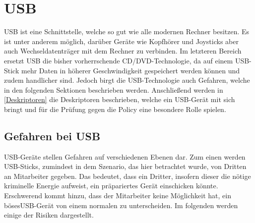 \chapter{USB}
USB ist eine Schnittstelle, welche so gut wie alle modernen Rechner besitzen. Es ist unter anderem möglich, darüber Geräte wie Kopfhörer und Joysticks aber auch Wechseldatenträger mit dem Rechner zu verbinden. Im letzteren Bereich ersetzt USB die bisher vorherrschende CD/DVD-Technologie, da auf einem USB-Stick mehr Daten in höherer Geschwindigkeit gespeichert werden können und zudem handlicher sind. Jedoch birgt die USB-Technologie auch Gefahren, welche in den folgenden Sektionen beschrieben werden. Anschließend werden in \ref{Deskriptoren} die Deskriptoren beschrieben, welche ein USB-Gerät mit sich bringt und für die Prüfung gegen die Policy eine besondere Rolle spielen.

\section{Gefahren bei USB}\label{GefBeiUSB}
USB-Geräte stellen Gefahren auf verschiedenen Ebenen dar. Zum einen werden USB-Sticks, zumindest in dem Szenario, das hier betrachtet wurde, von Dritten an Mitarbeiter gegeben. Das bedeutet, dass ein Dritter, insofern dieser die nötige kriminelle Energie aufweist, ein präpariertes Gerät einschicken könnte. Erschwerend kommt hinzu, dass der Mitarbeiter keine Möglichkeit hat, ein \glqq böses\grqq USB-Gerät von einem normalen zu unterscheiden. Im folgenden werden einige der Risiken dargestellt.

